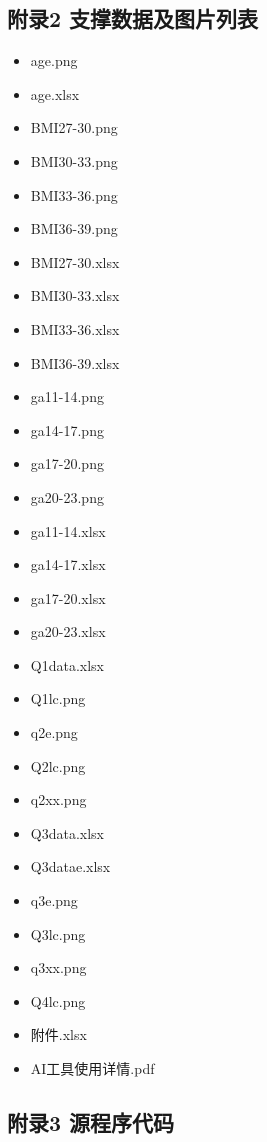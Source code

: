 \documentclass[12pt]{ctexart}
\begin{document}
\subsection*{附录2 支撑数据及图片列表}
\begin{itemize}[noitemsep, topsep=0pt, parsep=0pt, partopsep=0pt, leftmargin=1.5em]
	\item age.png
	\item age.xlsx
	\item BMI27-30.png
	\item BMI30-33.png
	\item BMI33-36.png
	\item BMI36-39.png
	\item BMI27-30.xlsx
	\item BMI30-33.xlsx
	\item BMI33-36.xlsx
	\item BMI36-39.xlsx
	\item ga11-14.png
	\item ga14-17.png
	\item ga17-20.png
	\item ga20-23.png
	\item ga11-14.xlsx
	\item ga14-17.xlsx
	\item ga17-20.xlsx
	\item ga20-23.xlsx
	\item Q1data.xlsx
	\item Q1lc.png
	\item q2e.png
	\item Q2lc.png
	\item q2xx.png
	\item Q3data.xlsx
	\item Q3datae.xlsx
	\item q3e.png
	\item Q3lc.png
	\item q3xx.png
	\item Q4lc.png
	\item 附件.xlsx
	\item AI工具使用详情.pdf
\end{itemize}
	\subsection*{附录3 源程序代码}
\end{document}

